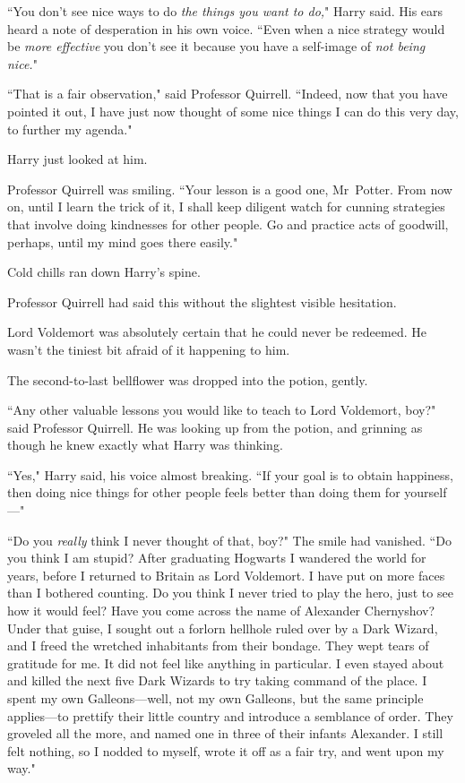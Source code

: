 ``You don't see nice ways to do \emph{the things you want to do,}" Harry said. His ears heard a note of desperation in his own voice. ``Even when a nice strategy would be \emph{more effective} you don't see it because you have a self-image of \emph{not being nice.}"

``That is a fair observation," said Professor Quirrell. ``Indeed, now that you have pointed it out, I have just now thought of some nice things I can do this very day, to further my agenda."

Harry just looked at him.

Professor Quirrell was smiling. ``Your lesson is a good one, Mr~Potter. From now on, until I learn the trick of it, I shall keep diligent watch for cunning strategies that involve doing kindnesses for other people. Go and practice acts of goodwill, perhaps, until my mind goes there easily."

Cold chills ran down Harry's spine.

Professor Quirrell had said this without the slightest visible hesitation.

Lord Voldemort was absolutely certain that he could never be redeemed. He wasn't the tiniest bit afraid of it happening to him.

The second-to-last bellflower was dropped into the potion, gently.

``Any other valuable lessons you would like to teach to Lord Voldemort, boy?" said Professor Quirrell. He was looking up from the potion, and grinning as though he knew exactly what Harry was thinking.

``Yes," Harry said, his voice almost breaking. ``If your goal is to obtain happiness, then doing nice things for other people feels better than doing them for yourself—"

``Do you \emph{really} think I never thought of that, boy?" The smile had vanished. ``Do you think I am stupid? After graduating Hogwarts I wandered the world for years, before I returned to Britain as Lord Voldemort. I have put on more faces than I bothered counting. Do you think I never tried to play the hero, just to see how it would feel? Have you come across the name of Alexander Chernyshov? Under that guise, I sought out a forlorn hellhole ruled over by a Dark Wizard, and I freed the wretched inhabitants from their bondage. They wept tears of gratitude for me. It did not feel like anything in particular. I even stayed about and killed the next five Dark Wizards to try taking command of the place. I spent my own Galleons—well, not my own Galleons, but the same principle applies—to prettify their little country and introduce a semblance of order. They groveled all the more, and named one in three of their infants Alexander. I still felt nothing, so I nodded to myself, wrote it off as a fair try, and went upon my way."

